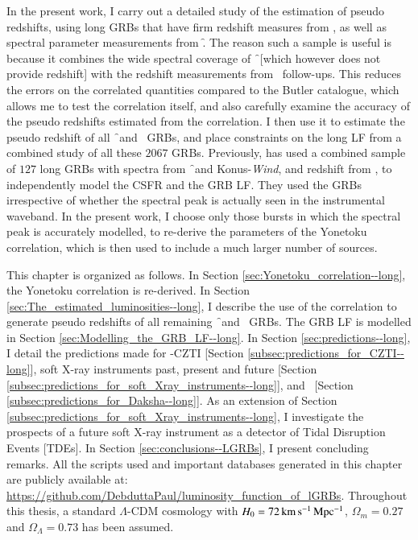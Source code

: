 In the present work, I carry out a detailed study of the estimation of pseudo redshifts, using long GRBs that have firm redshift measures from \s, as well as spectral parameter measurements from \f. The reason such a sample is useful is because it combines the wide spectral coverage of \f\ [which however does not provide redshift] with the redshift measurements from \s\ follow-ups. This reduces the errors on the correlated quantities compared to the Butler catalogue, which allows me to test the correlation itself, and also carefully examine the accuracy of the pseudo redshifts estimated from the correlation. I then use it to estimate the pseudo redshift  of all \f\ and \s\ GRBs, and place constraints on the long LF from a combined study of all these $2067$ GRBs. Previously, \cite{Yu_et_al.-2015-ApJS} has used a combined sample of $127$ long GRBs with spectra from \f\ and Konus-\emph{Wind}, and redshift from \s, to independently model the CSFR and the GRB LF. They used the GRBs irrespective of whether the spectral peak is actually seen in the instrumental waveband. In the present work, I choose only those bursts in which the spectral peak is accurately modelled, to re-derive the parameters of the Yonetoku correlation, which is then used to include a much larger number of sources.

This chapter is organized as follows. In Section \ref{sec:Yonetoku_correlation--long}, the Yonetoku correlation is re-derived. In Section \ref{sec:The_estimated_luminosities--long}, I describe the use of the correlation to generate pseudo redshifts of all remaining \f\ and \s\ GRBs. The GRB LF is modelled in Section \ref{sec:Modelling_the_GRB_LF--long}. In Section \ref{sec:predictions--long}, I detail the predictions made for \AS -CZTI [Section \ref{subsec:predictions_for_CZTI--long}], soft X-ray instruments past, present and future [Section \ref{subsec:predictions_for_soft_Xray_instruments--long}], and \D\ [Section \ref{subsec:predictions_for_Daksha--long}]. As an extension of Section \ref{subsec:predictions_for_soft_Xray_instruments--long}, I investigate the prospects of a future soft X-ray instrument as a detector of Tidal Disruption Events [TDEs]. In Section \ref{sec:conclusions--LGRBs}, I present concluding remarks. All the scripts used and important databases generated in this chapter are publicly available at: \url{https://github.com/DebduttaPaul/luminosity_function_of_lGRBs}. Throughout this thesis, a standard $\Lambda$-CDM cosmology with $H_0 = 72 \, \rm{km \, s^{-1} \, Mpc^{-1}}$, $\Omega_m = 0.27$ and $\Omega_{\Lambda} = 0.73$ has been assumed.


